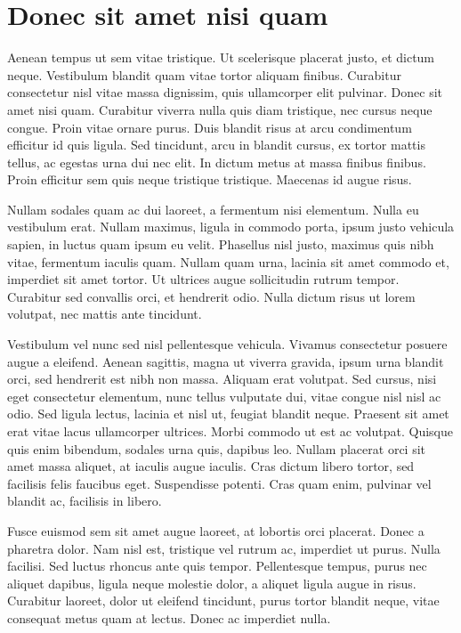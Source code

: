 \section{Donec sit amet nisi quam}
Aenean tempus ut sem vitae tristique. Ut scelerisque placerat justo, et dictum neque. Vestibulum blandit quam vitae tortor aliquam finibus. Curabitur consectetur nisl vitae massa dignissim, quis ullamcorper elit pulvinar. Donec sit amet nisi quam. Curabitur viverra nulla quis diam tristique, nec cursus neque congue. Proin vitae ornare purus. Duis blandit risus at arcu condimentum efficitur id quis ligula. Sed tincidunt, arcu in blandit cursus, ex tortor mattis tellus, ac egestas urna dui nec elit. In dictum metus at massa finibus finibus. Proin efficitur sem quis neque tristique tristique. Maecenas id augue risus.

Nullam sodales quam ac dui laoreet, a fermentum nisi elementum. Nulla eu vestibulum erat. Nullam maximus, ligula in commodo porta, ipsum justo vehicula sapien, in luctus quam ipsum eu velit. Phasellus nisl justo, maximus quis nibh vitae, fermentum iaculis quam. Nullam quam urna, lacinia sit amet commodo et, imperdiet sit amet tortor. Ut ultrices augue sollicitudin rutrum tempor. Curabitur sed convallis orci, et hendrerit odio. Nulla dictum risus ut lorem volutpat, nec mattis ante tincidunt.

Vestibulum vel nunc sed nisl pellentesque vehicula. Vivamus consectetur posuere augue a eleifend. Aenean sagittis, magna ut viverra gravida, ipsum urna blandit orci, sed hendrerit est nibh non massa. Aliquam erat volutpat. Sed cursus, nisi eget consectetur elementum, nunc tellus vulputate dui, vitae congue nisl nisl ac odio. Sed ligula lectus, lacinia et nisl ut, feugiat blandit neque. Praesent sit amet erat vitae lacus ullamcorper ultrices. Morbi commodo ut est ac volutpat. Quisque quis enim bibendum, sodales urna quis, dapibus leo. Nullam placerat orci sit amet massa aliquet, at iaculis augue iaculis. Cras dictum libero tortor, sed facilisis felis faucibus eget. Suspendisse potenti. Cras quam enim, pulvinar vel blandit ac, facilisis in libero.

Fusce euismod sem sit amet augue laoreet, at lobortis orci placerat. Donec a pharetra dolor. Nam nisl est, tristique vel rutrum ac, imperdiet ut purus. Nulla facilisi. Sed luctus rhoncus ante quis tempor. Pellentesque tempus, purus nec aliquet dapibus, ligula neque molestie dolor, a aliquet ligula augue in risus. Curabitur laoreet, dolor ut eleifend tincidunt, purus tortor blandit neque, vitae consequat metus quam at lectus. Donec ac imperdiet nulla.

